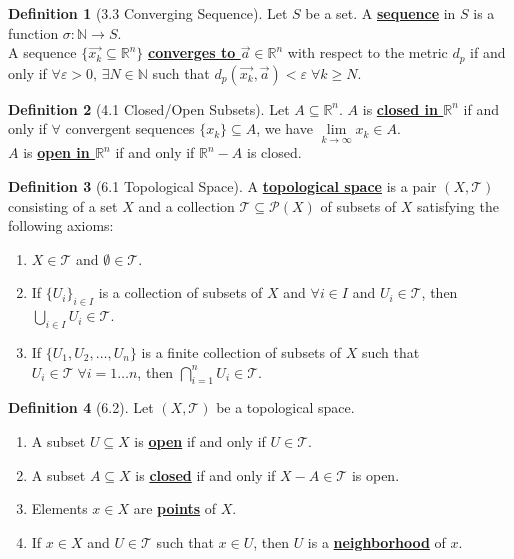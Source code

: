 \documentclass{article}
\newcommand{\R}{\ensuremath{\mathbb{R}}}
\newcommand{\N}{\ensuremath{\mathbb{N}}}
\newcommand{\nbd}{neighborhood}
\newcommand{\Iff}{if and only if}
\newcommand{\es}{\ensuremath{\emptyset}}
\newcommand{\powset}[1]{\ensuremath{\mathcal{P}(#1)}}
\newcommand{\define}[1]{\textbf{\underline{#1}}}
\newcommand{\func}[3]{\ensuremath{#1: #2 \to #3}}
\newcommand{\tp}{\ensuremath{\mathscr{T}}}
\newcommand{\Ts}[2]{\ensuremath{(#1,#2)}}
\newcommand{\Union}{\bigcup}
\newcommand{\Inter}{\bigcap}
\renewcommand{\Subset}{\subseteq}
\theoremstyle{definition}
\newtheorem*{defn}{Definition}
\theoremstyle{remark}
\begin{document}
{        \begin{defn}[3.3 Converging Sequence]
            Let $S$ be a set. A \define{sequence} in $S$ is a function $\func{\sigma}{\N}{S}$.\\
            A sequence $\{\Vec{x_k} \Subset \R^n\}$ \define{converges to $\Vec{a} \in \R^n$} with respect to the metric $d_p$ \Iff{} $\forall \varepsilon>0, \, \exists N \in \N$ such that $d_p(\Vec{x_k},\Vec{a})<\varepsilon \; \forall k\geq N$.
        \end{defn}
        
        \begin{defn}[4.1 Closed/Open Subsets]
            Let $A \Subset \R^n$. $A$ is \define{closed in $\R^n$} \Iff{} $\forall$ convergent sequences $\{x_k\} \Subset A$, we have $\lim\limits_{k \to \infty} x_k \in A$.\\
            $A$ is \define{open in $\R^n$} \Iff{} $\R^n-A$ is closed.\\
        \end{defn}
        
        \begin{defn}[6.1 Topological Space]
            A \define{topological space} is a pair $\Ts{X}{\tp}$ consisting of a set $X$ and a collection $\tp \Subset \powset{X}$ of subsets of $X$ satisfying the following axioms:
            \begin{enumerate}
                \item $X \in \tp$ and $\es \in \tp$.
                \item If $\{U_i\}_{i\in I}$ is a collection of subsets of $X$ and $\forall i\in I$ and $U_i \in \tp$, then $\Union\limits_{i\in I} U_i\in \tp$.
                \item If $\{U_1,U_2,\ldots,U_n\}$ is a finite collection of subsets of $X$ such that $U_i \in \tp \; \forall i=1\ldots n$, then $\Inter\limits_{i=1}^n U_i \in \tp$.
            \end{enumerate}
        \end{defn}
        
        \begin{defn}[6.2]
            Let $\Ts{X}{\tp}$ be a topological space.
            \begin{enumerate}
                \item A subset $U \Subset X$ is \define{open} \Iff{} $U \in \tp$.
                \item A subset $A \Subset X$ is \define{closed} \Iff{} $X-A \in \tp$ is open.
                \item Elements $x\in X$ are \define{points} of $X$.
                \item If $x \in X$ and $U \in \tp$ such that $x \in U$, then $U$ is a \define{\nbd{}} of $x$.
            \end{enumerate}
        \end{defn}
        
}
\end{document}
